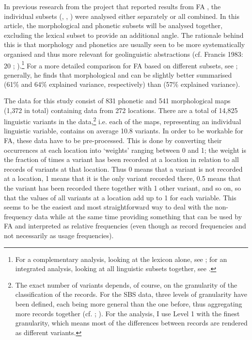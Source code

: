 \documentclass[output=paper]{LSP/langsci}
\begin{document}
In previous research from the project that reported results from FA \citep{pickl_probabilistische_2013,pickl_verdichtungen_2013,buhler_dialektraume_2014,proll_raumvariation_2015,proll_raumvariation_2015}, the individual subsets (, , ) were analysed either separately or all combined. In this article, the morphological and phonetic subsets will be analysed together, excluding the lexical subset to provide an additional angle. The rationale behind this is that morphology and phonetics are usually seen to be more systematically organised and thus more relevant for geolinguistic abstractions (cf. Francis 1983: 20%
; \citealt[41, 119]{labov_atlas_2006-1}).\footnote{For a complementary analysis, looking at the lexicon alone, see \citet{pickl_probabilistische_2013,pickl_verdichtungen_2013}; for an integrated analysis, looking at all linguistic subsets together, see \citet{proll_raumvariation_2015}.} For a more detailed comparison for FA based on different subsets, see \citet[84--132]{proll_raumvariation_2015}; generally, he finds that morphological and  can be slightly better summarised (61\% and 64\% explained variance, respectively) than  (57\% explained variance).

The data for this study consist of 831 phonetic and 541 morphological maps (1,372 in total) containing data from 272 locations. There are a total of 14,825 linguistic variants in the data,\footnote{The exact number of variants depends, of course, on the granularity of the classification of the records. For the SBS data, three levels of granularity have been defined, each being more general than the one before, thus aggregating more records together (cf. \citealt[75--78]{pickl_probabilistische_2013}; \citealt[47--48]{proll_raumvariation_2015}). For the analysis, I use Level 1 with the finest granularity, which means most of the differences between records are rendered as different variants.} i.e. each of the maps, representing an individual linguistic variable, contains on average 10.8 variants. In order to be workable for FA, these data have to be pre-processed. This is done by converting their occurrences at each location into ‘weights’ ranging between 0 and 1; the weight is the fraction of times a variant has been recorded at a location in relation to all records of variants at that location. Thus 0 means that a variant is not recorded at a location, 1 means that it is the only variant recorded there, 0.5 means that the variant has been recorded there together with 1 other variant, and so on, so that the values of all variants at a location add up to 1 for each variable. This seems to be the easiest and most straightforward way to deal with the non-frequency data while at the same time providing something that can be used by FA and interpreted as relative frequencies (even though as record frequencies and not necessarily as usage frequencies). 
\end{document}
